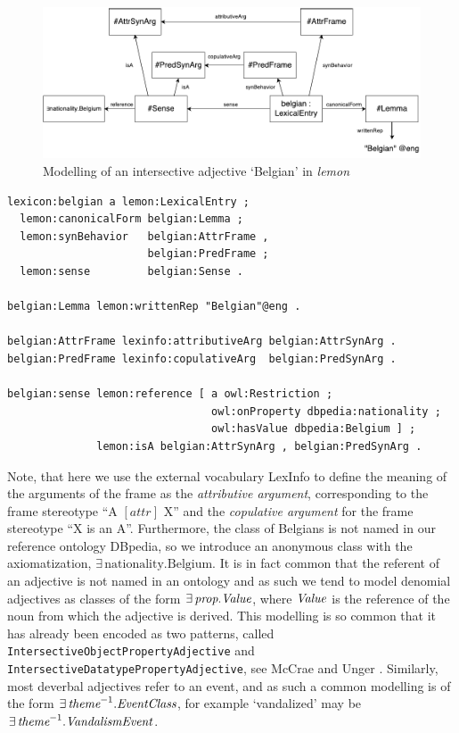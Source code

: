 \documentclass[11pt]{article}
\begin{document}
\begin{figure}
\includegraphics[width=\textwidth]{belgian-example}
\caption{Modelling of an intersective adjective `Belgian' in \emph{lemon}\label{example-belgian}}
\end{figure}

\begin{verbatim}
lexicon:belgian a lemon:LexicalEntry ;
  lemon:canonicalForm belgian:Lemma ;
  lemon:synBehavior   belgian:AttrFrame , 
                      belgian:PredFrame ;
  lemon:sense         belgian:Sense .

belgian:Lemma lemon:writtenRep "Belgian"@eng .

belgian:AttrFrame lexinfo:attributiveArg belgian:AttrSynArg .
belgian:PredFrame lexinfo:copulativeArg  belgian:PredSynArg .

belgian:sense lemon:reference [ a owl:Restriction ;
                                owl:onProperty dbpedia:nationality ;
                                owl:hasValue dbpedia:Belgium ] ;
              lemon:isA belgian:AttrSynArg , belgian:PredSynArg .
\end{verbatim}

Note, that here we use the external vocabulary LexInfo \cite{cimiano2011lexinfo} 
to define the meaning of the arguments of the frame as the \emph{attributive 
argument}, corresponding to the frame stereotype ``A $[attr]$ X'' and the 
\emph{copulative argument} for the frame stereotype ``X is an A''. Furthermore,
the class of Belgians is not named in our reference ontology DBpedia, so we 
introduce an anonymous class with the axiomatization, 
$\exists\,\text{nationality}.\text{Belgium}$. It is in fact common that the 
referent of an adjective is not named in an ontology and as such we tend to 
model denomial adjectives as classes of the form $\exists\,\text{\em prop}.\text{\em Value}$, 
where $\text{\em Value}$ is the reference of the noun from which the adjective is
derived. This modelling is so common that it has already been encoded as two
patterns, called {\tt IntersectiveObjectPropertyAdjective} and {\tt
IntersectiveDatatypePropertyAdjective}, see McCrae and Unger .
Similarly, most deverbal adjectives refer to an event, and as such
a common modelling is of the form $\exists\,\text{\em theme}^{-1}.\text{\em EventClass}$, 
for example `vandalized' may be $\exists\,\text{\em theme}^{-1}.\text{\em VandalismEvent}$.
\end{document}
